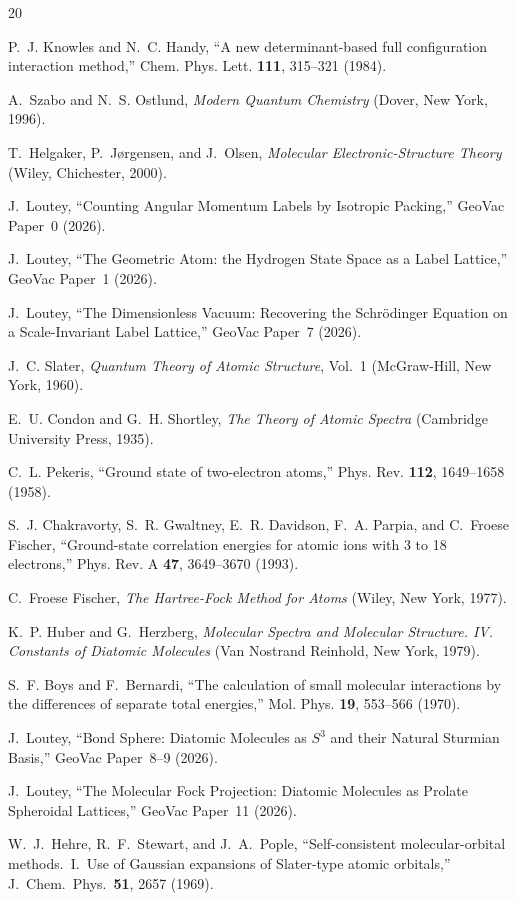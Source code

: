 \documentclass[aps,pra,twocolumn,superscriptaddress,longbibliography,floatfix]{revtex4-2}
\begin{document}
\begin{thebibliography}{20}

P.~J. Knowles and N.~C. Handy,
``A new determinant-based full configuration interaction method,''
Chem. Phys. Lett. \textbf{111}, 315--321 (1984).

A.~Szabo and N.~S. Ostlund,
\textit{Modern Quantum Chemistry}
(Dover, New York, 1996).

T.~Helgaker, P.~J\o rgensen, and J.~Olsen,
\textit{Molecular Electronic-Structure Theory}
(Wiley, Chichester, 2000).

J.~Loutey,
``Counting Angular Momentum Labels by Isotropic Packing,''
GeoVac Paper~0 (2026).

J.~Loutey,
``The Geometric Atom: the Hydrogen State Space as a Label Lattice,''
GeoVac Paper~1 (2026).

J.~Loutey,
``The Dimensionless Vacuum: Recovering the Schr\"odinger Equation
on a Scale-Invariant Label Lattice,''
GeoVac Paper~7 (2026).

J.~C. Slater,
\textit{Quantum Theory of Atomic Structure}, Vol.~1
(McGraw-Hill, New York, 1960).

E.~U. Condon and G.~H. Shortley,
\textit{The Theory of Atomic Spectra}
(Cambridge University Press, 1935).

C.~L. Pekeris,
``Ground state of two-electron atoms,''
Phys. Rev. \textbf{112}, 1649--1658 (1958).

S.~J. Chakravorty, S.~R. Gwaltney, E.~R. Davidson, F.~A. Parpia,
and C.~Froese Fischer,
``Ground-state correlation energies for atomic ions with 3 to 18
electrons,''
Phys. Rev. A \textbf{47}, 3649--3670 (1993).

C.~Froese Fischer,
\textit{The Hartree-Fock Method for Atoms}
(Wiley, New York, 1977).

K.~P. Huber and G.~Herzberg,
\textit{Molecular Spectra and Molecular Structure. IV. Constants
of Diatomic Molecules}
(Van Nostrand Reinhold, New York, 1979).

S.~F. Boys and F.~Bernardi,
``The calculation of small molecular interactions by the differences
of separate total energies,''
Mol. Phys. \textbf{19}, 553--566 (1970).

J.~Loutey,
``Bond Sphere: Diatomic Molecules as $S^3$ and their Natural
Sturmian Basis,''
GeoVac Paper~8--9 (2026).

J.~Loutey,
``The Molecular Fock Projection: Diatomic Molecules as Prolate
Spheroidal Lattices,''
GeoVac Paper~11 (2026).

W.~J.~Hehre, R.~F.~Stewart, and J.~A.~Pople,
``Self-consistent molecular-orbital methods.\ I.\ Use of Gaussian
expansions of Slater-type atomic orbitals,''
J.~Chem.~Phys.\ \textbf{51}, 2657 (1969).

\end{thebibliography}
\end{document}

